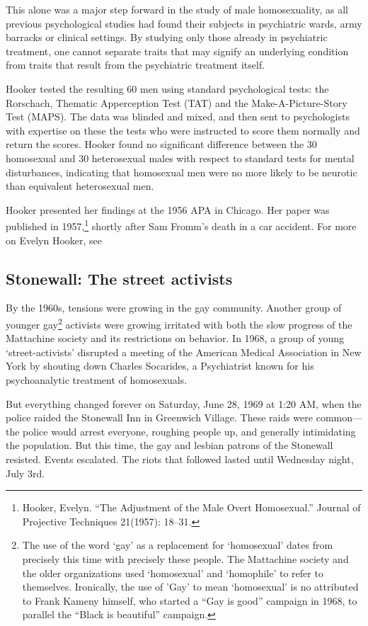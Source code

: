 \begin{refsection}
This alone was a major step forward in the study of male homosexuality, as all previous psychological studies had found their subjects in psychiatric wards, army barracks or clinical settings. By studying only those already in psychiatric treatment, one cannot separate traits that may signify an underlying condition from traits that result from the psychiatric treatment itself.

Hooker tested the resulting 60 men using standard psychological tests: the Rorschach, Thematic Apperception Test (TAT) and the Make-A-Picture-Story Test (MAPS). The data was blinded and mixed, and then sent to psychologists with expertise on these the tests who were instructed to score them normally and return the scores. Hooker found no significant difference between the 30 homosexual and 30 heterosexual males with respect to standard tests for mental disturbances, indicating that homosexual men were no more likely to be neurotic than equivalent heterosexual men.

Hooker presented her findings at the 1956 APA in Chicago. Her paper was published in 1957,\footnote{Hooker, Evelyn. ``The Adjustment of the Male Overt Homosexual.'' Journal of Projective Techniques 21(1957): 18--31.} shortly after Sam Fromm's death in a car accident. For more on Evelyn Hooker, see ~\citep{Aldrich:2005wq}

\subsection{Stonewall: The street activists}
\label{stonewall:thestreetactivists}

By the 1960s, tensions were growing in the gay community. Another group of younger gay\footnote{The use of the word `gay' as a replacement for `homosexual' dates from precisely this time with precisely these people. The Mattachine society and the older organizations used `homosexual' and `homophile' to refer to themselves. Ironically, the use of ’Gay' to mean ‘homosexual’ is no attributed to Frank Kameny himself, who started a “Gay is good” campaign in 1968, to parallel the “Black is beautiful” campaign.} activists were growing irritated with both the slow progress of the Mattachine society and its restrictions on behavior. In 1968, a group of young `street-activists' disrupted a meeting of the American Medical Association in New York by shouting down Charles Socarides, a Psychiatrist known for his psychoanalytic treatment of homosexuals.

But everything changed forever on Saturday, June 28, 1969 at 1:20 AM, when the police raided the Stonewall Inn in Greenwich Village. These raids were common---the police would arrest everyone, roughing people up, and generally intimidating the population. But this time, the gay and lesbian patrons of the Stonewall resisted. Events escalated. The riots that followed lasted until Wednesday night, July 3rd. 
\begin{marginfigure}
 \begin{center}


\end{center}
\end{marginfigure}
\end{refsection}
